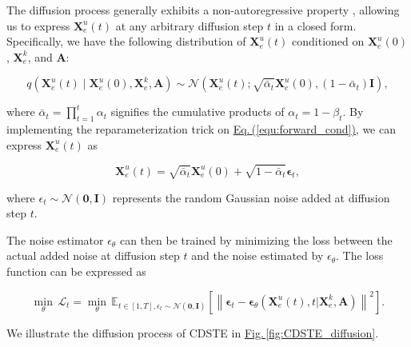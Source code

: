 \documentclass[a4paper,fleqn,12pt]{cas-sc}
\begin{document}
The diffusion process generally exhibits a non-autoregressive property \citep{ho2020denoising}, allowing us to express $\boldsymbol{X}^{u}_{e}(t)$ at any arbitrary diffusion step $t$ in a closed form. Specifically, we have the following distribution of $\boldsymbol{X}^{u}_{e}(t)$ conditioned on $\boldsymbol{X}^{u}_{e}(0)$, $\boldsymbol{X}^{k}_{e}$, and $\boldsymbol{A}$:
\begin{linenomath*}
\begin{equation}
q\left(\boldsymbol{X}^{u}_{e}(t) \mid \boldsymbol{X}^{u}_{e}(0), \boldsymbol{X}^{k}_{e}, \boldsymbol{A}\right)\sim\mathcal{N}\left(\boldsymbol{X}^{u}_{e}(t) ; \sqrt{\bar{\alpha}_t} \boldsymbol{X}^{u}_{e}(0),\left(1-\bar{\alpha}_t\right) \boldsymbol{I}\right),
\label{equ:forward_cond}
\end{equation}
\end{linenomath*}
where $\bar{\alpha}_t=\prod _{t=1}^t \alpha_t$ signifies the cumulative products of $\alpha_t = 1 - \beta_t$.
\noindent By implementing the reparameterization trick on \hyperref[equ:forward_cond]{Eq.\,(\ref{equ:forward_cond})}, we can express $\boldsymbol{X}^{u}_{e}(t)$ as
\begin{linenomath*}
\begin{equation}
\boldsymbol{X}^{u}_{e}(t) =\sqrt{\bar{\alpha}_t} \boldsymbol{X}^{u}_{e}(0)+\sqrt{1-\bar{\alpha}_t} \boldsymbol{\epsilon}_{t},
\label{equ:DDPM_add_noise}
\end{equation}
\end{linenomath*}
where $\epsilon_{t} \sim \mathcal{N}\left(\boldsymbol{0}, \boldsymbol{I}\right)$ represents the random Gaussian noise added at diffusion step $t$.

The noise estimator $\epsilon_{\theta}$ can then be trained by minimizing the loss between the actual added noise at diffusion step $t$ and the noise estimated by $\epsilon_{\theta}$. The loss function can be expressed as
\begin{linenomath*}
\begin{equation}
\min _{\theta}\,\mathcal{L}_t =\min _{\theta}\,\mathbb{E}_{t \in [1, T], \epsilon_{t}\sim\mathcal{N}(\boldsymbol{0}, \boldsymbol{I})}
\left[\left\|\boldsymbol{\epsilon}_{t}-\boldsymbol{\epsilon}_\theta\left(\boldsymbol{X}^{u}_{e}(t), t | \boldsymbol{X}^{k}_{e}, \boldsymbol{A}\right)\right\|^2\right].
\end{equation}
\end{linenomath*}

We illustrate the diffusion process of CDSTE in \hyperref[fig:CDSTE_diffusion]{Fig.\,\ref{fig:CDSTE_diffusion}}.
\end{document}
